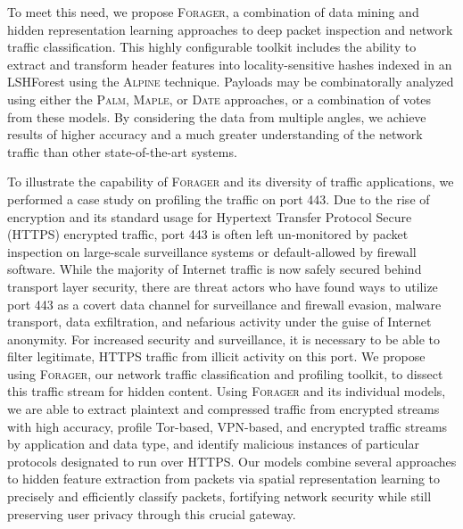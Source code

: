 To meet this need, we propose \textsc{Forager}, a combination of data mining and hidden representation learning approaches to deep packet inspection and network traffic classification. This highly configurable toolkit includes the ability to extract and transform header features into locality-sensitive hashes indexed in an LSHForest using the \textsc{Alpine} technique. Payloads may be combinatorally analyzed using either the \textsc{Palm}, \textsc{Maple}, or \textsc{Date} approaches, or a combination of votes from these models. By considering the data from multiple angles, we achieve results of higher accuracy and a much greater understanding of the network traffic than other state-of-the-art systems.

To illustrate the capability of \textsc{Forager} and its diversity of traffic applications, we performed a case study on profiling the traffic on port 443. Due to the rise of encryption and its standard usage for Hypertext Transfer Protocol Secure (HTTPS) encrypted traffic, port 443 is often left un-monitored by packet inspection on large-scale surveillance systems or default-allowed by firewall software. While the majority of Internet traffic is now safely secured behind transport layer security, there are threat actors who have found ways to utilize port 443 as a covert data channel for surveillance and firewall evasion, malware transport, data exfiltration, and nefarious activity under the guise of Internet anonymity. For increased security and surveillance, it is necessary to be able to filter legitimate, HTTPS traffic from illicit activity on this port. We propose using \textsc{Forager}, our network traffic classification and profiling toolkit, to dissect this traffic stream for hidden content. Using \textsc{Forager} and its individual models, we are able to extract plaintext and compressed traffic from encrypted streams with high accuracy, profile Tor-based, VPN-based, and encrypted traffic streams by application and data type, and identify malicious instances of particular protocols designated to run over HTTPS. Our models combine several approaches to hidden feature extraction from packets via spatial representation learning to precisely and efficiently classify packets, fortifying network security while still preserving user privacy through this crucial gateway.
